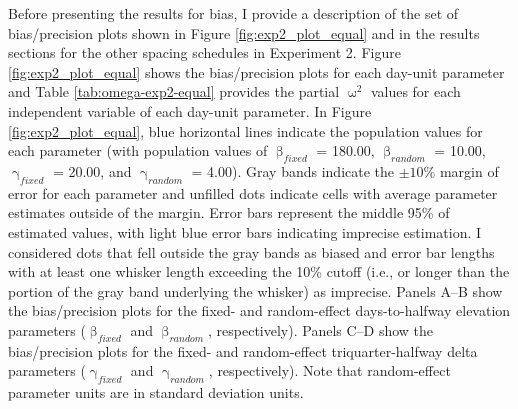 \documentclass[
12pt, %
twoside,
english]{guelphthesis}
\begin{document}
Before presenting the results for bias, I provide a description of the set of bias/precision plots shown in Figure \ref{fig:exp2_plot_equal} and in the results sections for the other spacing schedules in Experiment 2. Figure \ref{fig:exp2_plot_equal} shows the bias/precision plots for each day-unit parameter and Table \ref{tab:omega-exp2-equal} provides the partial \(\upomega^2\) values for each independent variable of each day-unit parameter. In Figure \ref{fig:exp2_plot_equal}, blue horizontal lines indicate the population values for each parameter (with population values of \(\upbeta_{fixed}\) = 180.00, \(\upbeta_{random}\) = 10.00, \(\upgamma_{fixed}\) = 20.00, and \(\upgamma_{random}\) = 4.00). Gray bands indicate the \(\pm 10\%\) margin of error for each parameter and unfilled dots indicate cells with average parameter estimates outside of the margin. Error bars represent the middle 95\% of estimated values, with light blue error bars indicating imprecise estimation. I considered dots that fell outside the gray bands as biased and error bar lengths with at least one whisker length exceeding the 10\% cutoff (i.e., or longer than the portion of the gray band underlying the whisker) as imprecise. Panels A--B show the bias/precision plots for the fixed- and random-effect days-to-halfway elevation parameters (\(\upbeta_{fixed}\) and \(\upbeta_{random}\), respectively). Panels C--D show the bias/precision plots for the fixed- and random-effect triquarter-halfway delta parameters (\(\upgamma_{fixed}\) and \(\upgamma_{random}\), respectively). Note that random-effect parameter units are in standard deviation units.
\end{document}
